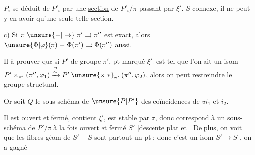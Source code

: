  $P_i$ se déduit de $P'_i$ par une
\uline{section} de $P'_i/\pi$ passant par $\overline{\xi'}$. $S$ 
connexe, il ne peut y en avoir qu'une
seule telle section.

c) Si $\pi\mathrel{\unsure{-|\to}}\pi'\rightrightarrows\pi''$ est exact,
alors  $\unsure{\Phi|\varphi}(\pi)\mathrel{-}\Phi(\pi')\rightrightarrows\Phi(\pi'')$ aussi.

Il  à prouver que si $P'$ de groupe $\pi'$,
pt marqué $\xi'$, est tel que  l'on
ait un isom $P'\times_{\pi'}(\pi'',\varphi_1)\overset{u}{\xrightarrow{\sim}}P'\mathbin{\unsure{\times|*}}_{\pi'}(\pi'',\varphi_2)$,
alors on peut restreindre le groupe structural.

Or soit $Q$ le sous-schéma de $\unsure{P|P'}$
des coïncidences de $ui_1$ et $i_2$.


Il est ouvert et fermé, contient
$\xi'$, est stable par $\pi$, donc
correspond à un sous-schéma de
$P'/\pi$ à la fois ouvert et fermé $S'$
[descente   plat et  ]
De plus, on voit que les  fibres géom
de $S'\mathrel{-}S$ sont partout un pt ; donc
c'est un isom $S'\to S$ , on a gagné
